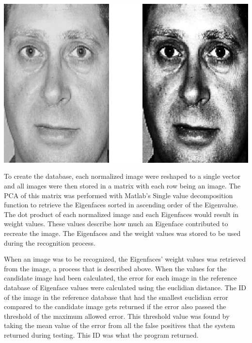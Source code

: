 \begin{Figure}
  \centering
    \includegraphics[width=0.7\linewidth]{withhist.jpg}
\end{Figure}

To create the database, each normalized image were reshaped to a single vector and all images were then stored in a matrix with each row being an image. The PCA of this matrix was performed with Matlab’s Single value decomposition function to retrieve the Eigenfaces sorted in ascending order of the Eigenvalue. The dot product of each normalized image and each Eigenfaces would result in weight values. These values describe how much an Eigenface contributed to recreate the image. The Eigenfaces and the weight values was stored to be used during the recognition process.

When an image was to be recognized, the Eigenfaces’ weight values was retrieved from the image, a process that is described above. When the values for the candidate image had been calculated, the error for each image in the reference database of Eigenface values were calculated using the euclidian distance. The ID of the image in the reference database that had the smallest euclidian error compared to the candidate image gets returned if the error also passed the threshold of the maximum allowed error. This threshold value was found by taking the mean value of the error from all the false positives that the system returned during testing. This ID was what the program returned.

